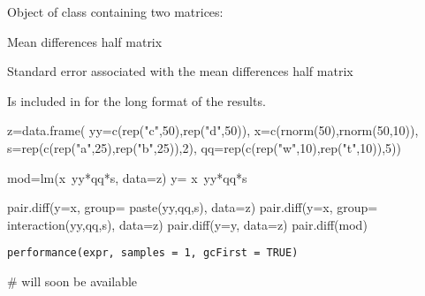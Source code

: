 \documentclass[a4paper]{book}
\begin{document}
%
\begin{Value}
Object of class  containing two matrices:

\begin{ldescription}
\item[\code{diff.m  }] Mean differences half matrix 
\item[\code{diff.se }] Standard error associated with the mean differences half matrix

\end{ldescription}
\end{Value}
%
\begin{SeeAlso}\relax
Is included in  for the long format of the results.
\end{SeeAlso}
%
\begin{Examples}
\begin{ExampleCode}

z=data.frame( yy=c(rep("c",50),rep("d",50)),
              x=c(rnorm(50),rnorm(50,10)),
              s=rep(c(rep("a",25),rep("b",25)),2),
              qq=rep(c(rep("w",10),rep("t",10)),5))

mod=lm(x~yy*qq*s, data=z)
y= x~yy*qq*s

pair.diff(y=x, group= paste(yy,qq,s), data=z)
pair.diff(y=x, group= interaction(yy,qq,s), data=z)
pair.diff(y=y, data=z)
pair.diff(mod)
\end{ExampleCode}
\end{Examples}
\newpage
{}
%
\begin{Usage}
\begin{verbatim}
performance(expr, samples = 1, gcFirst = TRUE)
\end{verbatim}
\end{Usage}
%
\begin{Arguments}
\begin{ldescription}
\item[\code{expr}] 


\item[\code{samples}] 


\item[\code{gcFirst}] 


\end{ldescription}
\end{Arguments}
%
\begin{Examples}
\begin{ExampleCode}
# will soon be available
\end{ExampleCode}
\end{Examples}
\end{document}
